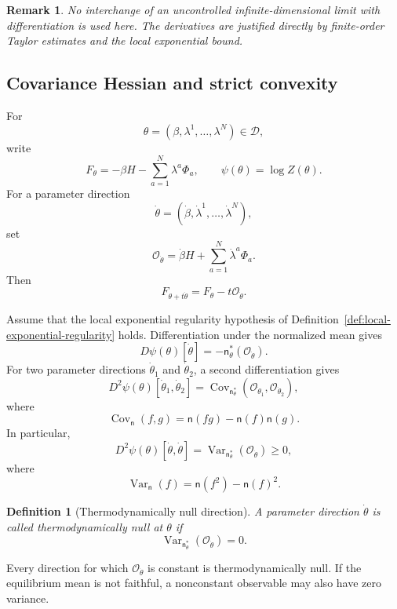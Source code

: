 \documentclass[11pt,reqno]{amsart}
\newtheorem{Definition}[Theorem]{Definition}
\newtheorem{rem}[Theorem]{Remark}
\begin{document}
\begin{rem}
No interchange of an uncontrolled infinite-dimensional limit with
differentiation is used here. The derivatives are justified directly
by finite-order Taylor estimates and the local exponential bound.
\end{rem}

\subsection{Covariance Hessian and strict convexity}
\label{subsec:covariance-hessian}

For
\[
\theta=(\beta,\lambda^1,\ldots,\lambda^N)\in\mathcal D,
\]
write
\[
F_\theta
=
-\beta H-\sum_{a=1}^{N}\lambda^a\Phi_a,
\qquad
\psi(\theta)
=
\log Z(\theta).
\]
For a parameter direction
\[
\dot\theta
=
(\dot\beta,\dot\lambda^1,\ldots,\dot\lambda^N),
\]
set
\[
\mathcal O_{\dot\theta}
=
\dot\beta H+\sum_{a=1}^{N}\dot\lambda^a\Phi_a.
\]
Then
\[
F_{\theta+t\dot\theta}
=
F_\theta-t\mathcal O_{\dot\theta}.
\]

Assume that the local exponential regularity hypothesis of
Definition~\ref{def:local-exponential-regularity} holds. Differentiation
under the normalized mean gives
\[
D\psi(\theta)[\dot\theta]
=
-\mathsf n_\theta^*(\mathcal O_{\dot\theta}).
\]
For two parameter directions $\dot\theta_1$ and $\dot\theta_2$, a second
differentiation gives
\[
D^2\psi(\theta)
[\dot\theta_1,\dot\theta_2]
=
\operatorname{Cov}_{\mathsf n_\theta^*}
\left(
\mathcal O_{\dot\theta_1},
\mathcal O_{\dot\theta_2}
\right),
\]
where
\[
\operatorname{Cov}_{\mathsf n}(f,g)
=
\mathsf n(fg)-\mathsf n(f)\mathsf n(g).
\]
In particular,
\[
D^2\psi(\theta)[\dot\theta,\dot\theta]
=
\operatorname{Var}_{\mathsf n_\theta^*}
(\mathcal O_{\dot\theta})
\geq 0,
\]
where
\[
\operatorname{Var}_{\mathsf n}(f)
=
\mathsf n(f^2)-\mathsf n(f)^2.
\]

\begin{Definition}[Thermodynamically null direction]
\label{def:null-direction}
A parameter direction $\dot\theta$ is called
\emph{thermodynamically null at $\theta$} if
\[
\operatorname{Var}_{\mathsf n_\theta^*}
(\mathcal O_{\dot\theta})=0.
\]
\end{Definition}

Every direction for which $\mathcal O_{\dot\theta}$ is constant is
thermodynamically null. If the equilibrium mean is not faithful, a
nonconstant observable may also have zero variance.
\end{document}
